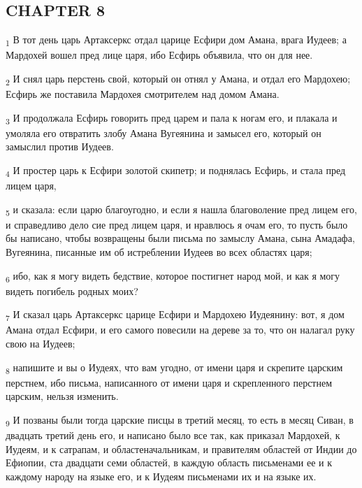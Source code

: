 \subsection{CHAPTER 8}
\begin{tcolorbox}
\textsubscript{1} В тот день царь Артаксеркс отдал царице Есфири дом Амана, врага Иудеев; а Мардохей вошел пред лице царя, ибо Есфирь объявила, что он для нее.
\end{tcolorbox}
\begin{tcolorbox}
\textsubscript{2} И снял царь перстень свой, который он отнял у Амана, и отдал его Мардохею; Есфирь же поставила Мардохея смотрителем над домом Амана.
\end{tcolorbox}
\begin{tcolorbox}
\textsubscript{3} И продолжала Есфирь говорить пред царем и пала к ногам его, и плакала и умоляла его отвратить злобу Амана Вугеянина и замысел его, который он замыслил против Иудеев.
\end{tcolorbox}
\begin{tcolorbox}
\textsubscript{4} И простер царь к Есфири золотой скипетр; и поднялась Есфирь, и стала пред лицем царя,
\end{tcolorbox}
\begin{tcolorbox}
\textsubscript{5} и сказала: если царю благоугодно, и если я нашла благоволение пред лицем его, и справедливо дело сие пред лицем царя, и нравлюсь я очам его, то пусть было бы написано, чтобы возвращены были письма по замыслу Амана, сына Амадафа, Вугеянина, писанные им об истреблении Иудеев во всех областях царя;
\end{tcolorbox}
\begin{tcolorbox}
\textsubscript{6} ибо, как я могу видеть бедствие, которое постигнет народ мой, и как я могу видеть погибель родных моих?
\end{tcolorbox}
\begin{tcolorbox}
\textsubscript{7} И сказал царь Артаксеркс царице Есфири и Мардохею Иудеянину: вот, я дом Амана отдал Есфири, и его самого повесили на дереве за то, что он налагал руку свою на Иудеев;
\end{tcolorbox}
\begin{tcolorbox}
\textsubscript{8} напишите и вы о Иудеях, что вам угодно, от имени царя и скрепите царским перстнем, ибо письма, написанного от имени царя и скрепленного перстнем царским, нельзя изменить.
\end{tcolorbox}
\begin{tcolorbox}
\textsubscript{9} И позваны были тогда царские писцы в третий месяц, то есть в месяц Сиван, в двадцать третий день его, и написано было все так, как приказал Мардохей, к Иудеям, и к сатрапам, и областеначальникам, и правителям областей от Индии до Ефиопии, ста двадцати семи областей, в каждую область письменами ее и к каждому народу на языке его, и к Иудеям письменами их и на языке их.
\end{tcolorbox}
